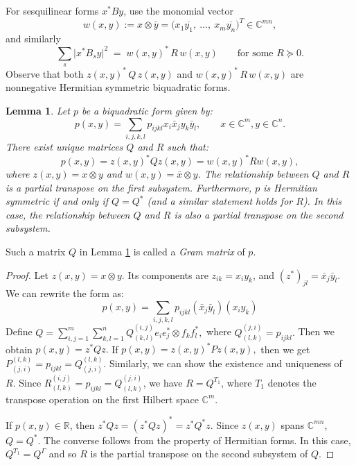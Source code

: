 \documentclass[12pt,a4paper]{amsart}
\theoremstyle{plain}
\newtheorem{lemma}[theorem]{Lemma}
\theoremstyle{remark}
\theoremstyle{definition}
\def \C {\mathbb{C}}
\begin{document}
For sesquilinear forms $x^{*}By$, use the monomial vector
\[
w(x,y):=x \otimes \bar{y}=  \bigl(x_1\overline{y_{1}},\ \ldots,\ x_m \overline{y_{n}} \bigr)^{T}\in\mathbb C^{mn},
\]
and similarly
\[
\sum_{s}\bigl|x^{*}B_{s}y\bigr|^{2}
\;=\;
w(x,y)^{*}\,R\,w(x,y)
\qquad\text{for some } R\succeq 0.
\]
Observe that both $z(x,y)^{*}\,Q\,z(x,y)$ and $w(x,y)^{*}\,R\,w(x,y)$ are nonnegative Hermitian symmetric biquadratic forms.
\begin{lemma}\label{Grammatrix}
	Let $p$ be a biquadratic form given by:
	\[ p(x,y) = \sum_{i,j,k,l} p_{ijkl} x_i\bar{x}_j y_k \bar{y}_l, \qquad  x\in \C^m, y\in \C^n .\]
	There exist unique matrices $Q$ and $R$ such that:
	\[ p(x,y) = z(x,y)^* Q z(x,y) = w(x,y)^* R w(x,y), \]
	where $z(x,y) = x \otimes y$ and $w(x,y) = \bar{x} \otimes y$. 
	The relationship between $Q$ and $R$ is a partial transpose on the first subsystem.
	Furthermore, $p$ is Hermitian symmetric if and only if $Q = Q^*$ (and a similar statement holds for $R$). In this case, the relationship between $Q$ and $R$ is also a partial transpose on the second subsystem.
\end{lemma}
Such a matrix $Q$ in Lemma \ref{Grammatrix} is called a \textit{Gram matrix} of $p.$
\begin{proof}%
Let $z(x,y) = x \otimes y$. Its components are $z_{ik} = x_i y_k$, and $(z^*)_{jl} = \bar{x}_j \bar{y}_l$. We can rewrite the form as:
	\[ p(x,y) = \sum_{i,j,k,l} p_{ijkl} (\bar{x}_j \bar{y}_l) (x_i y_k) \]
Define $Q=\sum_{i,j=1}^m\sum_{k,l=1}^n Q^{(i,j)}_{(k,l)} e_{i}e_j^* \otimes f_{k}f_l^*,$ where $Q_{(l,k)}^{(j,i)} = p_{ijkl}.$ Then we obtain $p(x,y) = z^* Q z.$ If $p(x,y) =z(x,y)^* P z(x,y), $ then we get $P_{(j,i)}^{(l,k)} = p_{ijkl} = Q_{(j,i)}^{(l,k)}.$ Similarly, we can show the existence and uniqueness of $R.$ 
	Since $R_{(l,k)}^{(i,j)} = p_{ijkl} = Q_{(l,k)}^{(j,i)}$, we have $R = Q^{T_1}$, where $T_1$ denotes the transpose operation on the first Hilbert space $\mathbb{C}^m$.
	
	
If $p(x,y) \in \mathbb{R}$, then $z^* Q z = (z^* Q z)^* = z^* Q^* z$. Since $z(x,y)$ spans $\mathbb{C}^{mn}$, $Q = Q^*$. The converse follows from the property of Hermitian forms. In this case, $Q^{T_1}= Q^{\Gamma}$ and so $R$ is the partial transpose on the second subsystem of $Q.$
\end{proof}
\end{document}
